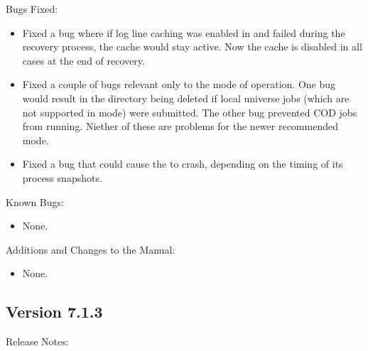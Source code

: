 
\noindent Bugs Fixed:

\begin{itemize}

\item Fixed a bug where if log line caching was enabled in 
and  failed during the recovery process, the cache would
stay active. Now the cache is disabled in all cases at the end of recovery.

\item Fixed a couple of bugs relevant only to the 
mode of operation. One bug would result in the  directory being
deleted if local universe jobs (which are not supported in
 mode) were submitted. The other bug prevented
COD jobs from running. Niether of these are problems for the newer
recommended  mode.

\item Fixed a bug that could cause the  to crash, depending
on the timing of its process snapshots.

\end{itemize}

\noindent Known Bugs:

\begin{itemize}

\item None.

\end{itemize}

\noindent Additions and Changes to the Manual:

\begin{itemize}

\item None.

\end{itemize}



\subsection*{\label{sec:New-7-1-3}Version 7.1.3}

\noindent Release Notes:

